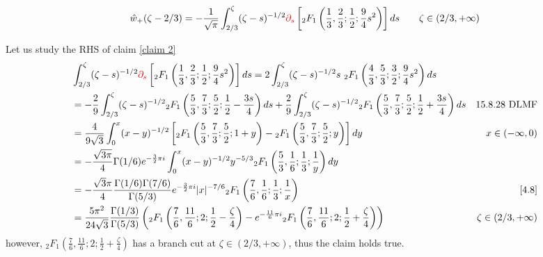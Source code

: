 \documentclass[11pt,a4paper,twoside,leqno,noamsfonts]{amsart}
\numberwithin{equation}{section}
\begin{document}
\begin{example}[Airy]
\begin{claim}\label{claim 2}
\begin{equation}
\hat{w}_+(\zeta-2/3)=-\frac{1}{\sqrt{\pi}}\int_{2/3}^{\zeta}(\zeta-s)^{-1/2}\textcolor{red}{\partial_s}\left[{}_2F_1\left(\frac{1}{3},\frac{2}{3};\frac{1}{2};\frac{9}{4}s^2\right)\right]ds \qquad \zeta\in(2/3,+\infty)
\end{equation}
\end{claim}

Let us study the RHS of claim \eqref{claim 2}
\begin{align*}
&\int_{2/3}^{\zeta}(\zeta-s)^{-1/2}\textcolor{red}{\partial_s}\left[{}_2F_1\left(\frac{1}{3},\frac{2}{3};\frac{1}{2};\frac{9}{4}s^2\right)\right]ds=2\int_{2/3}^{\zeta}(\zeta-s)^{-1/2}s\,\,{}_2F_1\left(\frac{4}{3},\frac{5}{3};\frac{3}{2};\frac{9}{4}s^2\right)ds & \\
&= -\frac{2}{9}\int_{2/3}^{\zeta}(\zeta-s)^{-1/2}{}_2F_1\left(\frac{5}{3},\frac{7}{3};\frac{5}{2};\frac{1}{2}-\frac{3s}{4}\right)ds+\frac{2}{9}\int_{2/3}^{\zeta}(\zeta-s)^{-1/2}{}_2F_1\left(\frac{5}{3},\frac{7}{3};\frac{5}{2};\frac{1}{2}+\frac{3s}{4}\right)ds & 15.8.28 \text{ DLMF} \\
&=\frac{4}{9\sqrt{3}}\int_0^x(x-y)^{-1/2}\left[{}_2F_1\left(\frac{5}{3},\frac{7}{3};\frac{5}{2};1+y\right)-{}_2F_1\left(\frac{5}{3},\frac{7}{3};\frac{5}{2};y\right)\right]dy & x\in (-\infty,0) \\
&=-\frac{\sqrt{3\pi}}{4}\Gamma(1/6)e^{-\frac{3}{2}\pi i}\int_0^x(x-y)^{-1/2}y^{-5/3}{}_2F_1\left(\frac{5}{3},\frac{1}{6};\frac{1}{3};\frac{1}{y}\right)dy & \\
&=-\frac{\sqrt{3}\pi}{4}\frac{\Gamma(1/6)\Gamma(7/6)}{\Gamma(5/3)}e^{-\frac{3}{2}\pi i} |x|^{-7/6}{}_2F_1\left(\frac{7}{6},\frac{1}{6};\frac{1}{3};\frac{1}{x}\right) & \eqref{4.8} \\
&=\frac{5\pi^2}{24\sqrt{3}}\frac{\Gamma(1/3)}{\Gamma(5/3)}\left({}_2F_1\left(\frac{7}{6},\frac{11}{6};2;\frac{1}{2}-\frac{\zeta}{4}\right)-e^{-\frac{11}{6}\pi i}{}_2F_1\left(\frac{7}{6},\frac{11}{6};2;\frac{1}{2}+\frac{\zeta}{4}\right)\right) & \zeta\in (2/3,+\infty)
\end{align*}
however, ${}_2F_1\left(\frac{7}{6},\frac{11}{6};2;\frac{1}{2}+\frac{\zeta}{4}\right)$ has a branch cut at $\zeta\in(2/3,+\infty)$, thus the claim holds true. 


\end{example}
\end{document}
